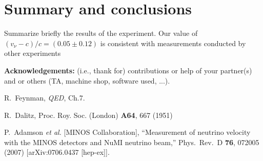 \documentclass[11pt,letterpaper,onecolumn]{article}
\begin{document}
\section{Summary and conclusions}

Summarize briefly the results of the experiment. Our value 
of $(v_\nu - c)/c  = (0.05\pm0.12)$  is consistent
with measurements conducted by other experiments~\cite{OtherExpts}

{\bf Acknowledgements:} (i.e., thank for) contributions or help
of your partner(s) and or
others (TA, machine shop, software used, ...).


\begin{thebibliography}{9}

R.~Feynman, {\it QED}, Ch.7.

R.~Dalitz, Proc. Roy. Soc. (London) {\bf A64}, 667 (1951)

P.~Adamson {\it et al.}  [MINOS Collaboration],
  ``Measurement of neutrino velocity with the MINOS detectors and NuMI neutrino beam,''
  Phys.\ Rev.\ D {\bf 76}, 072005 (2007)
  [arXiv:0706.0437 [hep-ex]].

\end{thebibliography}

\end{document}
